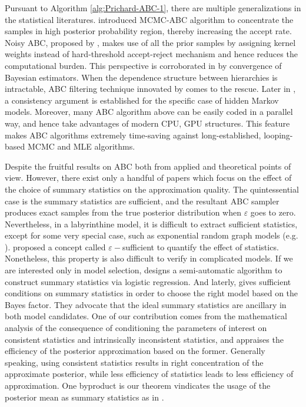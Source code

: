\documentclass[oneside,english]{amsbook}
\numberwithin{section}{chapter}
\numberwithin{equation}{section}
\numberwithin{figure}{section}
\theoremstyle{plain}
\theoremstyle{plain}
\theoremstyle{definition}
\theoremstyle{plain}
\theoremstyle{plain}
\theoremstyle{remark}
\theoremstyle{definition}
\theoremstyle{definition}
\begin{document}
Pursuant to Algorithm \ref{alg:Prichard-ABC-1}, there are multiple
generalizations in the statistical literatures. \citet{marjoram2003markov}
{introduced } MCMC-ABC algorithm to concentrate the
samples in high posterior probability region, thereby increasing the
accept rate. Noisy ABC, proposed by \citet{wilkinson2013approximate},
makes use of all the prior samples by assigning kernel weights instead
of hard-threshold accept-reject mechanism and hence reduces the computational
burden. This perspective is corroborated in \citet{fearnhead2012constructing}
by convergence of Bayesian estimators. When the dependence structure
between hierarchies is intractable, ABC filtering technique innovated
by \citet{jasra2012filtering} comes to the rescue. Later in \citet{dean2014parameter},
a consistency argument is established for the specific case of hidden
Markov models. Moreover, many ABC algorithm above can be easily coded
in a parallel way, and hence take advantages of modern CPU, GPU structures.
This feature makes ABC algorithms extremely time-saving against long-established,
looping-based MCMC and MLE algorithms. 

Despite the fruitful results on ABC both from applied and theoretical
points of view. However, there exist only a handful of papers which
focus on the effect of the choice of summary statistics on the approximation
quality. The quintessential case is the summary statistics are sufficient,
and the resultant ABC sampler produces exact samples from the true
posterior distribution when $\varepsilon$ goes to zero. Nevertheless,
in a labyrinthine model, it is difficult to extract sufficient statistics,
except for some very special case, such as exponential random graph
models (e.g. \citet{grelaud2009abc}). \citet{joyce2008approximately}
proposed a concept called $\varepsilon-$sufficient to quantify the
effect of statistics. Nonetheless, this property is also difficult
to verify in complicated models. If we are interested only in model
selection, \citet{prangle2014semi} designs a semi-automatic algorithm
to construct summary statistics via logistic regression. And laterly,
\citet{marin2014relevant} gives sufficient conditions on summary
statistics in order to choose the right model based on the Bayes factor.
They advocate that the ideal summary statistics are ancillary in both
model candidates. One of our contribution comes from the mathematical
analysis of the consequence of conditioning the parameters of interest
on consistent statistics and intrinsically inconsistent statistics,
and appraises the efficiency of the posterior approximation based
on the former. Generally speaking, using consistent statistics results
in right concentration of the approximate posterior, while less efficiency
of statistics leads to less efficiency of approximation. One byproduct
is our theorem vindicates the usage of the posterior mean as summary
statistics as in \citet{fearnhead2012constructing}. 
\end{document}
